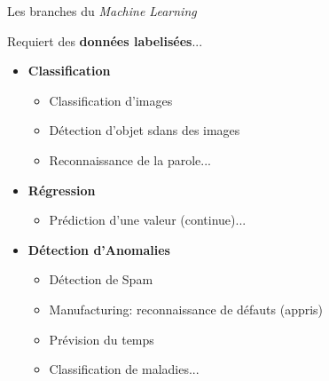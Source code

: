 \documentclass[10pt,serif,mathserif,compress,hyperref={colorlinks}]{beamer}
\begin{document}
\begin{frame}{Les branches du {\em Machine Learning}}

  \begin{tcolorbox}[title={\em Supervised learning}\\Apprentissage supervisé]
  Requiert des {\bf données labelisées}...
    \begin{itemize}
    \item \textbf{Classification}
      \begin{itemize}
      \item Classification d'images
      \item Détection d'objet sdans des images
      \item Reconnaissance de la parole...
      \end{itemize}
    \item \textbf{Régression}
      \begin{itemize}
      \item Prédiction d'une valeur (continue)...
      \end{itemize}
    \item \textbf{Détection d'Anomalies}
      \begin{itemize}
      \item Détection de Spam
      \item Manufacturing: reconnaissance de défauts (appris)
      \item Prévision du temps
      \item Classification de maladies...
      \end{itemize}        
    \end{itemize}
  \end{tcolorbox}
\end{frame}
\end{document}
